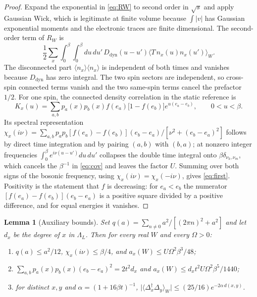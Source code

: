 \documentclass[11pt]{article}
\newtheorem{lemma}[theorem]{Lemma}
\theoremstyle{definition}
\theoremstyle{remark}
\begin{document}
\begin{proof}
Expand the exponential in \eqref{eq:RW} to second order in $\sqrt{s}$ and apply
Gaussian Wick, which is legitimate at finite volume because $\int|v|$ has Gaussian
exponential moments and the electronic traces are finite dimensional. The
second-order term of $R_W$ is
\begin{equation}
\frac12\sum_x\int_0^\beta\!\!\int_0^\beta du\,du'\,
D_{\mathrm{dyn}}(u-u')\bigl\langle T\,n_x(u)n_x(u')\bigr\rangle_W .
\label{eq:second}
\end{equation}
The disconnected part $\langle n_x\rangle\langle n_x\rangle$ is independent of both
times and vanishes because $D_{\mathrm{dyn}}$ has zero integral. The two spin sectors
are independent, so cross-spin connected terms vanish and the two same-spin terms
cancel the prefactor $1/2$. For one spin, the connected density correlation in the
static reference is
\begin{equation}
K_x(u)=\sum_{a,b}p_a(x)p_b(x)f(e_a)\bigl[1-f(e_b)\bigr]e^{u(e_a-e_b)},\qquad
0<u<\beta .
\label{eq:Kx}
\end{equation}
Its spectral representation
$\chi_x(i\nu)=\sum_{a,b}p_ap_b[f(e_a)-f(e_b)](e_b-e_a)/[\nu^2+(e_b-e_a)^2]$ follows
by direct time integration and by pairing $(a,b)$ with $(b,a)$; at nonzero integer
frequencies $\int_0^\beta e^{i\nu(u-u')}du\,du'$ collapses the double time integral
onto $\beta\delta_{\nu_k,\nu_m}$, which cancels the $\beta^{-1}$ in \eqref{eq:cov} and
leaves the factor $U$. Summing over both signs of the bosonic frequency, using
$\chi_x(i\nu)=\chi_x(-i\nu)$, gives \eqref{eq:first}. Positivity is the statement
that $f$ is decreasing: for $e_a<e_b$ the numerator
$[f(e_a)-f(e_b)](e_b-e_a)$ is a positive square divided by a positive difference, and
for equal energies it vanishes.
\end{proof}

\begin{lemma}[Auxiliary bounds]
\label{lem:aux}
Set $q(a)=\sum_{n\ne0}a^2/[(2\pi n)^2+a^2]$ and let $d_x$ be the degree of $x$ in
$\Lambda_L$. Then for every real $W$ and every $\Omega>0$:
\begin{enumerate}[label=(\roman*),leftmargin=2.2em]
\item $q(a)\le a^2/12$, $\chi_x(i\nu)\le\beta/4$, and
$a_x(W)\le U\Omega^2\beta^3/48$;
\item $\sum_{a,b}p_a(x)p_b(x)(e_b-e_a)^2=2t^2d_x$ and
$a_x(W)\le d_xt^2U\Omega^2\beta^5/1440$;
\item for distinct $x,y$ and $\alpha=(1+16\beta t)^{-1}$,
$\bigl|\langle\Delta_x^\dagger\Delta_y\rangle_W\bigr|
\le(25/16)e^{-2\alpha\,d(x,y)}$.
\end{enumerate}
\end{lemma}
\end{document}
